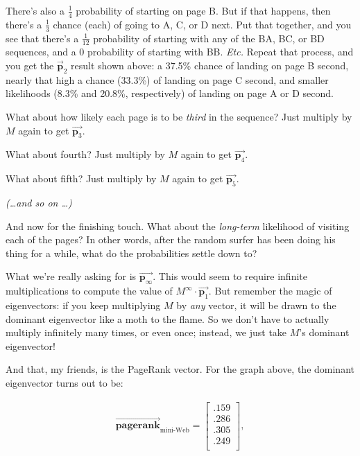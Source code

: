 \begin{alttitles}
There's also a $\frac{1}{4}$ probability of starting on page B. But if that
happens, then there's a $\frac{1}{3}$ chance (each) of going to A, C, or D
next. Put that together, and you see that there's a $\frac{1}{12}$ probability
of starting with any of the BA, BC, or BD sequences, and a 0 probability of
starting with BB. \textit{Etc.} Repeat that process, and you get the
$\overrightarrow{\textbf{p}}_2$ result shown above: a 37.5\% chance of landing
on page B second, nearly that high a chance (33.3\%) of landing on page C
second, and smaller likelihoods (8.3\% and 20.8\%, respectively) of landing on
page A or D second.

What about how likely each page is to be \textit{third} in the sequence? Just
multiply by $M$ again to get $\overrightarrow{\textbf{p}_3}$.

What about fourth? Just multiply by $M$ again to get
$\overrightarrow{\textbf{p}_4}$. 

What about fifth? Just multiply by $M$ again to get
$\overrightarrow{\textbf{p}_5}$. 

\textit{(\dots and so on \dots)}

And now for the finishing touch. What about the \textit{long-term} likelihood
of visiting each of the pages? In other words, after the random surfer has been
doing his thing for a while, what do the probabilities settle down to?

What we're really asking for is $\overrightarrow{\textbf{p}_\infty}$. This
would seem to require infinite multiplications to compute the value of
$M^\infty \cdot \overrightarrow{\textbf{p}_1}$. But remember the magic of
eigenvectors: if you keep multiplying $M$ by \textit{any} vector, it will be
drawn to the dominant eigenvector like a moth to the flame. So we don't have to
actually multiply infinitely many times, or even once; instead, we just take
$M$'s dominant eigenvector!

And that, my friends, is the PageRank vector. For the graph above, the dominant
eigenvector turns out to be:

\vspace{-.15in}
\begin{align*}
\overrightarrow{\textbf{pagerank}}_\textrm{mini-Web} =
\begin{bmatrix}
.159 \\
.286 \\
.305 \\
.249 \\
\end{bmatrix},
\end{align*}
\vspace{-.15in}


\end{alttitles}
